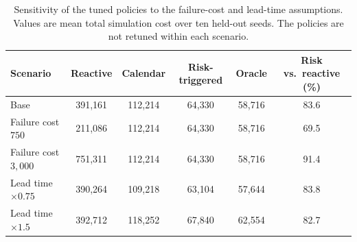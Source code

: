 \begin{table}[H]
\centering
\caption{Sensitivity of the tuned policies to the failure-cost and lead-time assumptions. Values are mean total simulation cost over ten held-out seeds. The policies are not retuned within each scenario.}
\label{tab:sim-sensitivity}
\small
\begin{tabular}{lccccc}
\toprule
Scenario & Reactive & Calendar & Risk-triggered & Oracle & Risk vs.\ reactive (\%) \\
\midrule
Base & 391,161 & 112,214 & 64,330 & 58,716 & 83.6 \\
Failure cost $750$ & 211,086 & 112,214 & 64,330 & 58,716 & 69.5 \\
Failure cost $3{,}000$ & 751,311 & 112,214 & 64,330 & 58,716 & 91.4 \\
Lead time $\times 0.75$ & 390,264 & 109,218 & 63,104 & 57,644 & 83.8 \\
Lead time $\times 1.5$ & 392,712 & 118,252 & 67,840 & 62,554 & 82.7 \\
\bottomrule
\end{tabular}
\end{table}
